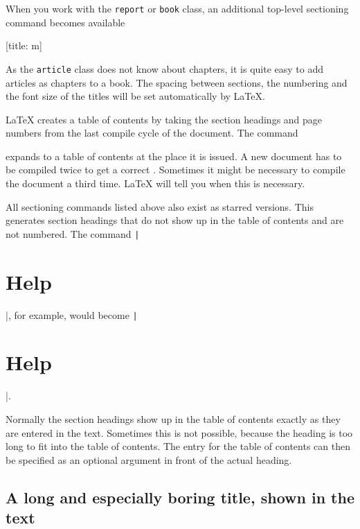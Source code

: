 When you work with the \texttt{report} or \texttt{book} class,
an additional top-level sectioning command becomes available
\begin{lscommand}
  [title: m]
\end{lscommand}

As the \texttt{article} class does not know about chapters, it is quite easy
to add articles as chapters to a book.
The spacing between sections, the numbering and the font size of the
titles will be set automatically by \LaTeX.

\LaTeX{} creates a table of contents by taking the section headings
and page numbers from the last compile cycle of the document. The command
\begin{lscommand}
\end{lscommand}
\noindent expands to a table of contents at the place it is issued. A new
document has to be compiled twice to get a correct .
Sometimes it might be necessary to compile the document a third time. \LaTeX{}
will tell you when this is necessary.

All sectioning commands listed above also exist as starred versions. This
generates section headings that do not show up in the table of contents and are
not numbered. The command \texttt|\section{Help}|, for example,
would become \texttt|\section*{Help}|.

Normally the section headings show up in the table of contents exactly
as they are entered in the text. Sometimes this is not possible,
because the heading is too long to fit into the table of contents. The
entry for the table of contents can then be specified as an
optional argument in front of the actual heading.

\begin{example}[standalone, paperwidth=6cm,paperheight=5cm]
\tableofcontents

\section[Title for the
  table of contents]{A long 
  and especially boring title,
  shown in the text}
\end{example}

